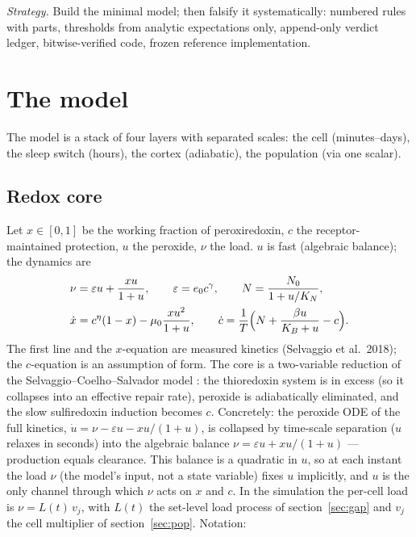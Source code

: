 \documentclass[11pt,a4paper]{article}
\theoremstyle{remark}
\begin{document}
\emph{Strategy.} Build the minimal model; then falsify it systematically: numbered rules
with parts, thresholds from analytic expectations only, append-only verdict ledger,
bitwise-verified code, frozen reference implementation.

\section{The model}\label{sec:model}
The model is a stack of four layers with separated scales: the cell (minutes--days),
the sleep switch (hours), the cortex (adiabatic), the population (via one scalar).

\subsection{Redox core}\label{sec:core}
Let $x\in[0,1]$ be the working fraction of peroxiredoxin, $c$ the receptor-maintained
protection, $u$ the peroxide, $\nu$ the load. $u$ is fast (algebraic balance); the
dynamics are
\begin{equation}\label{eq:core}
\begin{aligned}
&\nu=\varepsilon u+\frac{xu}{1+u},\qquad
\varepsilon=e_0c^{\gamma},\qquad
N=\frac{N_0}{1+u/K_N},\\
&\dot x=c^{\eta}(1-x)-\mu_0\frac{xu^2}{1+u},\qquad
\dot c=\frac{1}{T}\Bigl(N+\frac{\beta u}{K_B+u}-c\Bigr).
\end{aligned}
\end{equation}
The first line and the $x$-equation are measured kinetics (Selvaggio et al.\ 2018); the
$c$-equation is an assumption of form. The core is a two-variable reduction of the
Selvaggio--Coelho--Salvador model \cite{selvaggio}: the thioredoxin system is in excess
(so it collapses into an effective repair rate), peroxide is adiabatically eliminated,
and the slow sulfiredoxin induction becomes $c$. Concretely: the peroxide ODE of the full
kinetics, $\dot u=\nu-\varepsilon u-xu/(1+u)$, is collapsed by time-scale separation
($u$ relaxes in seconds) into the algebraic balance $\nu=\varepsilon u+xu/(1+u)$ ---
production equals clearance. This balance is a quadratic in $u$, so at each instant the
load $\nu$ (the model's input, not a state variable) fixes $u$ implicitly, and $u$ is
the only channel through which $\nu$ acts on $x$ and $c$. In the simulation the per-cell
load is $\nu=L(t)\,v_j$, with $L(t)$ the set-level load process of
section~\ref{sec:gap} and $v_j$ the cell multiplier of section~\ref{sec:pop}. Notation:
\end{document}
